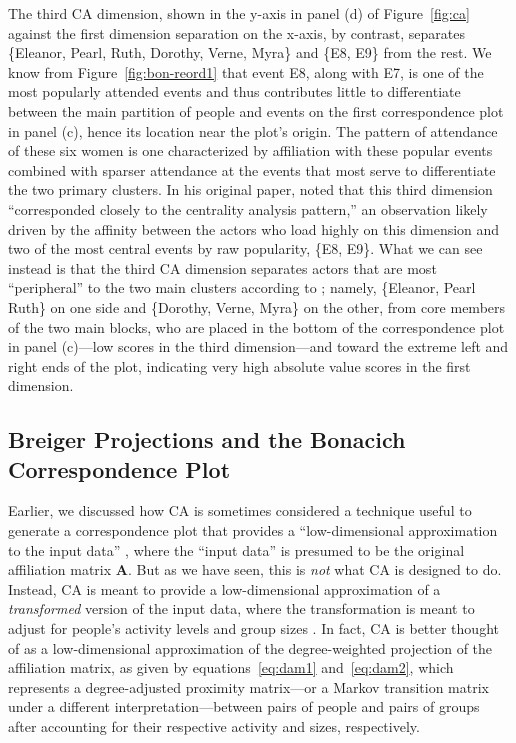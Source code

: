 \documentclass[a4paper,fleqn]{cas-sc}
\begin{document}
The third CA dimension, shown in the y-axis in panel (d) of Figure~\ref{fig:ca} against the first dimension separation on the x-axis, by contrast, separates \{Eleanor, Pearl, Ruth, Dorothy, Verne, Myra\} and \{E8, E9\} from the rest. We know from Figure~\ref{fig:bon-reord1} that event E8, along with E7, is one of the most popularly attended events and thus contributes little to differentiate between the main partition of people and events on the first correspondence plot in panel (c), hence its location near the plot's origin. The pattern of attendance of these six women is one characterized by affiliation with these popular events combined with sparser attendance at the events that most serve to differentiate the two primary clusters. In his original paper, \citet[164]{bonacich1991simultaneous} noted that this third dimension ``corresponded closely to the centrality analysis pattern,'' an observation likely driven by the affinity between the actors who load highly on this dimension and two of the most central events by raw popularity, \{E8, E9\}. What we can see instead is that the third CA dimension separates actors that are most ``peripheral'' to the two main clusters according to \citet{freeman2003finding}; namely, \{Eleanor, Pearl Ruth\} on one side and \{Dorothy, Verne, Myra\} on the other, from core members of the two main blocks, who are placed in the bottom of the correspondence plot in panel (c)---low scores in the third dimension---and toward the extreme left and right ends of the plot, indicating very high absolute value scores in the first dimension. 

\subsection{Breiger Projections and the Bonacich Correspondence Plot} \label{sec:eigplot}
Earlier, we discussed how CA is sometimes considered a technique useful to generate a correspondence plot that provides a ``low-dimensional approximation to the input data'' \citep[125]{faust2005using}, where the ``input data'' is presumed to be the original affiliation matrix $\mathbf{A}$. But as we have seen, this is \textit{not} what CA is designed to do. Instead, CA is meant to provide a low-dimensional approximation of a \textit{transformed} version of the input data, where the transformation is meant to adjust for people's activity levels and group sizes \citep{desposito2014comparison}. In fact, CA is better thought of as a low-dimensional approximation of the degree-weighted projection of the affiliation matrix, as given by equations~\ref{eq:dam1} and~\ref{eq:dam2}, which represents a degree-adjusted proximity matrix---or a Markov transition matrix under a different interpretation---between pairs of people and pairs of groups after accounting for their respective activity and sizes, respectively.
\end{document}
